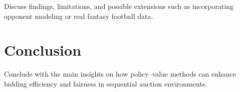 \documentclass[12pt]{article}
\begin{document}
Discuss findings, limitations, and possible extensions such as incorporating opponent modeling or real fantasy football data.

\section{Conclusion}

Conclude with the main insights on how policy--value methods can enhance bidding efficiency and fairness in sequential auction environments.

\clearpage
\glsaddall%
\printglossary[type=main, title=Glossario, nonumberlist]
\printglossary[type=\acronymtype, title=Acronimi, nonumberlist]

\newpage
\nocite{*}
\printbibliography[title=Bibliografia, heading=bibintoc]
\end{document}
